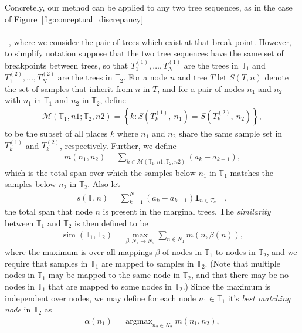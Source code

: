 \documentclass[10pt,twoside,lineno]{gsajnl}
\newcommand{\T}{\mathbb{T}}
\newcommand{\ind}{\mathbf{1}}
\newcommand{\argmax}{\operatorname{argmax}}
\newcommand{\similarity}{\operatorname{sim}}
\newcommand*{\figref}[2][]{%
	\hyperref[{#2}]{%
		Figure~\ref*{#2}%
		\ifx\\#1\\%
		\else
		\,#1%
		\fi
	}%
}
\begin{document}
Concretely, our method can be applied to any two tree sequences,
 as in the case of \figref{fig:conceptual_discrepancy},
 where we consider the pair of trees which exist at that break point.
However, to simplify notation suppose that the two tree sequences have the same set of breakpoints
between trees,
so that $T_1^{(1)}, \ldots, T_N^{(1)}$ are the trees in $\T_1$
and $T_1^{(2)}, \ldots, T_N^{(2)}$ are the trees in $\T_2$.
For a node $n$ and tree $T$
let $S(T, n)$ denote the set of samples that inherit from $n$ in $T$,
and for a pair of nodes $n_1$ and $n_2$ with $n_1$ in $\T_1$ and $n_2$ in $\T_2$,
define
\begin{align*}
	\mathcal{M}(\T_1, n1; \T_2, n2) = \left\{ k : S\left(T^{(1)}_k,\ n_1\right) = S\left(T^{(2)}_k,\ n_2\right) \right\},
\end{align*}
to be the subset of all places $k$ where $n_1$ and $n_2$ share the same sample set in $T_k^{(1)}$ and $T_k^{(2)}$, respectively.
Further, we define
\begin{align*}
    m(n_1, n_2)
    =
    \sum_{k\in \mathcal{M}(\T_1, n1; \T_2, n2)} (a_k - a_{k-1}) ,  
\end{align*}
which is the total span over which the samples below $n_1$ in $\T_1$
matches the samples below $n_2$ in $\T_2$.
Also let
\begin{align*}
    s(\T, n) = \sum_{k=1}^N (a_k - a_{k-1}) \ind_{n \in T_k} \quad ,
\end{align*}
the total span that node $n$ is present in the marginal trees.
The \emph{similarity} between $\T_1$ and $\T_2$ is then defined to be
\begin{align*}
    \similarity(\T_1, \T_2)
    =
    \max_{\beta:N_1 \to N_2} \sum_{n \in N_1} m(n, \beta(n)) ,
\end{align*}
where the maximum is over all mappings $\beta$ of nodes in $\T_1$ to nodes in $\T_2$, and we require that samples in $\T_1$ are mapped to samples in $\T_2$.
(Note that multiple nodes in $\T_1$ may be mapped to the same node in $\T_2$,
and that there may be no nodes in $\T_1$ that are mapped to some nodes in $\T_2$.)
Since the maximum is independent over nodes, we may define for each node $n_1 \in \T_1$
it's \emph{best matching node} in $\T_2$ as
\begin{align*}
    \alpha(n_1) = \argmax_{n_2 \in N_2} m(n_1, n_2) ,
\end{align*}
\end{document}
